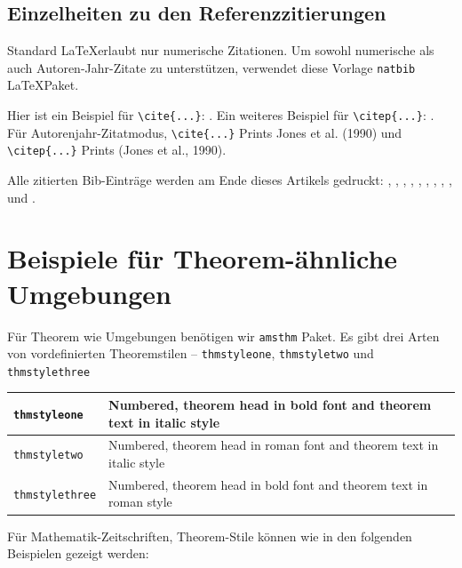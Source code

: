 \documentclass[pdflatex,sn-mathphys-num]{sn-jnl}%
\theoremstyle{thmstyleone}%
\theoremstyle{thmstyletwo}%
\theoremstyle{thmstylethree}%
\begin{document}
\subsection{Einzelheiten zu den Referenzzitierungen}\label{subsec7}

Standard \LaTeX erlaubt nur numerische Zitationen. Um sowohl numerische als auch Autoren-Jahr-Zitate zu unterstützen, verwendet diese Vorlage \verb+natbib+ \LaTeX Paket.

Hier ist ein Beispiel für \verb+\cite{...}+: \cite{bib1}. Ein weiteres Beispiel für \verb+\citep{...}+: \citep{bib2}. Für Autorenjahr-Zitatmodus, \verb+\cite{...}+ Prints Jones et al. (1990) und \verb+\citep{...}+ Prints (Jones et al., 1990).

Alle zitierten Bib-Einträge werden am Ende dieses Artikels gedruckt: \cite{bib3}, \cite{bib4}, \cite{bib5}, \cite{bib6}, \cite{bib7}, \cite{bib8}, \cite{bib9}, \cite{bib10}, \cite{bib11}, \cite{bib12} und \cite{bib13}.

\section{Beispiele für Theorem-ähnliche Umgebungen}\label{sec10}

Für Theorem wie Umgebungen benötigen wir \verb+amsthm+ Paket. Es gibt drei Arten von vordefinierten Theoremstilen – \verb+thmstyleone+, \verb+thmstyletwo+ und \verb+thmstylethree+ 

\bigskip\begin{tabular}{|l|p{19pc}|}
\hline
\verb+thmstyleone+ & Numbered, theorem head in bold font and theorem text in italic style \\\hline
\verb+thmstyletwo+ & Numbered, theorem head in roman font and theorem text in italic style \\\hline
\verb+thmstylethree+ & Numbered, theorem head in bold font and theorem text in roman style \\\hline
\end{tabular}
\bigskip%

Für Mathematik-Zeitschriften, Theorem-Stile können wie in den folgenden Beispielen gezeigt werden:
\end{document}
